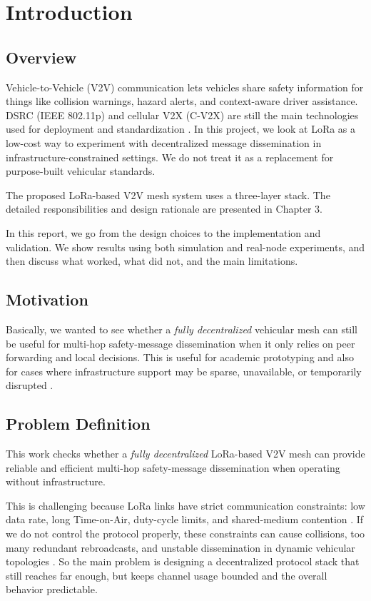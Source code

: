 \chapter{Introduction}

\section{Overview}

Vehicle-to-Vehicle (V2V) communication lets vehicles share safety information for things like collision
warnings, hazard alerts, and context-aware driver assistance. DSRC (IEEE 802.11p) and cellular V2X
(C-V2X) are still the main technologies used for deployment and standardization \cite{secure_iov,lorawan_v2roadside}.
In this project, we look at LoRa as a low-cost way to experiment with decentralized message dissemination in
infrastructure-constrained settings. We do not treat it as a replacement for purpose-built vehicular standards.

The proposed LoRa-based V2V mesh system uses a three-layer stack. The detailed responsibilities and design
rationale are presented in Chapter 3.

In this report, we go from the design choices to the implementation and validation. We show results using
both simulation and real-node experiments, and then discuss what worked, what did not, and the main
limitations.

\section{Motivation}

Basically, we wanted to see whether a \textit{fully decentralized} vehicular mesh can still be useful for multi-hop
safety-message dissemination when it only relies on peer forwarding and local decisions. This is useful for
academic prototyping and also for cases where infrastructure support may be sparse, unavailable, or temporarily
disrupted \cite{lora_mesh_emergency,lora_mesh_iot}.

\section{Problem Definition}

This work checks whether a \textit{fully decentralized} LoRa-based V2V mesh can provide reliable and efficient
multi-hop safety-message dissemination when operating without infrastructure.

This is challenging because LoRa links have strict communication constraints: low data rate, long Time-on-Air,
duty-cycle limits, and shared-medium contention \cite{lora_mesh_iot,routing_mesh_2020}. If we do not control the
protocol properly, these constraints can cause collisions, too many redundant rebroadcasts, and unstable
dissemination in dynamic vehicular topologies \cite{vdtn_routing_eval,lora_mesh_emergency}. So the main problem
is designing a decentralized protocol stack that still reaches far enough, but keeps channel usage bounded and
the overall behavior predictable.

